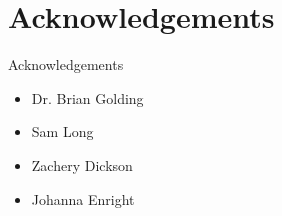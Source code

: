 \documentclass{beamer}
\begin{document}
			
		

	\section{Acknowledgements}
	\begin{frame}{Acknowledgements}
		\begin{itemize}
			\item Dr. Brian Golding \newline
			\item Sam Long \newline
			\item Zachery Dickson \newline
			\item Johanna Enright
		\end{itemize}
	\end{frame}
		
	
\end{document}
